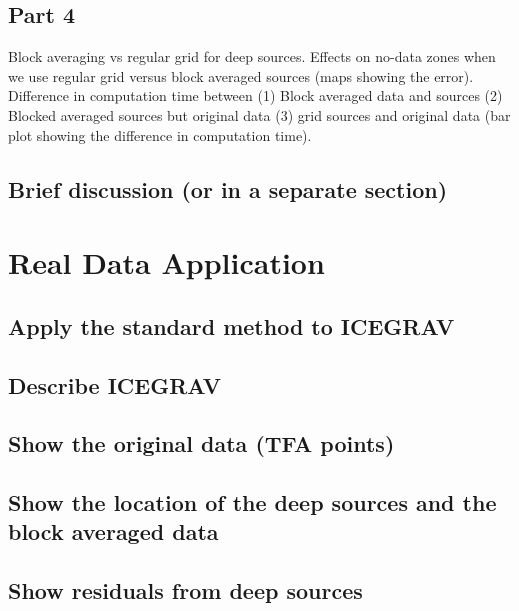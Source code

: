 \subsection{Part 4}
Block averaging vs regular grid for deep sources. Effects on no-data zones when we use regular grid versus block averaged sources (maps showing the error). Difference in computation time between (1) Block averaged data and sources (2) Blocked averaged sources but original data (3) grid sources and original data (bar plot showing the difference in computation time).

\subsection{Brief discussion (or in a separate section)}



\section{Real Data Application}

\subsection{Apply the standard method to ICEGRAV}

\subsection{Describe ICEGRAV}

\subsection{Show the original data (TFA points)}

\subsection{Show the location of the deep sources and the block averaged data}

\subsection{Show residuals from deep sources}

